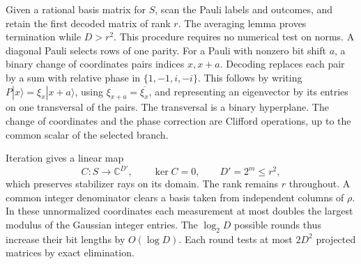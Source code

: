 \documentclass[11pt,letterpaper]{article}
\theoremstyle{definition}
\numberwithin{equation}{section}
\newcommand{\C}{\mathbb C}
\begin{document}
Given a rational basis matrix for \(S\), scan the Pauli labels and outcomes, and retain the first decoded matrix of rank \(r\). The averaging lemma proves termination while \(D>r^2\). This procedure requires no numerical test on norms. A diagonal Pauli selects rows of one parity. For a Pauli with nonzero bit shift \(a\), a binary change of coordinates pairs indices \(x,x+a\). Decoding replaces each pair by a sum with relative phase in \(\{1,-1,i,-i\}\). This follows by writing \(P|x\rangle=\xi_x|x+a\rangle\), using \(\xi_{x+a}=\overline{\xi_x}\), and representing an eigenvector by its entries on one transversal of the pairs. The transversal is a binary hyperplane. The change of coordinates and the phase correction are Clifford operations, up to the common scalar of the selected branch.

Iteration gives a linear map
\begin{equation}\label{eq:compress}
 C:S\longrightarrow\C^{D'},\qquad
 \ker C=0,\qquad D'=2^m\le r^2 ,
\end{equation}
which preserves stabilizer rays on its domain. The rank remains \(r\) throughout. A common integer denominator clears a basis taken from independent columns of \(\rho\). In these unnormalized coordinates each measurement at most doubles the largest modulus of the Gaussian integer entries. The \(\log_2D\) possible rounds thus increase their bit lengths by \(O(\log D)\). Each round tests at most \(2D^2\) projected matrices by exact elimination.
\end{document}

